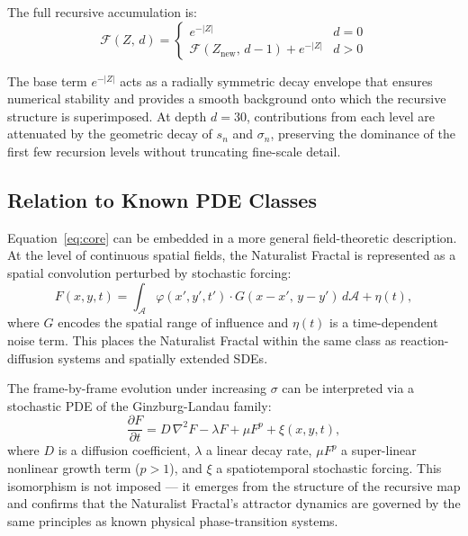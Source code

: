 \documentclass[twocolumn,amsmath,amssymb,prl]{revtex4-2}
\begin{document}
The full recursive accumulation is:
\begin{equation}
  \mathcal{F}(Z,\, d) = \begin{cases}
    e^{-|Z|} & d = 0 \\
    \mathcal{F}(Z_{\text{new}},\, d-1) + e^{-|Z|} & d > 0
  \end{cases}
\end{equation}

The base term $e^{-|Z|}$ acts as a radially symmetric decay envelope that
ensures numerical stability and provides a smooth background onto which the
recursive structure is superimposed.  At depth $d = 30$, contributions from
each level are attenuated by the geometric decay of $s_n$ and $\sigma_n$,
preserving the dominance of the first few recursion levels without truncating
fine-scale detail.

\subsection{Relation to Known PDE Classes}

Equation~\eqref{eq:core} can be embedded in a more general field-theoretic
description.  At the level of continuous spatial fields, the Naturalist
Fractal is represented as a spatial convolution perturbed by stochastic
forcing:
\begin{equation}
  F(x,y,t) = \int_{\mathcal{A}} \varphi(x',y',t') \cdot
              G(x-x',\, y-y') \, d\mathcal{A} + \eta(t),
\end{equation}
where $G$ encodes the spatial range of influence and $\eta(t)$ is a
time-dependent noise term.  This places the Naturalist Fractal within the
same class as reaction-diffusion systems and spatially extended SDEs.

The frame-by-frame evolution under increasing $\sigma$ can be interpreted via
a stochastic PDE of the Ginzburg-Landau family:
\begin{equation}
  \frac{\partial F}{\partial t} = D\,\nabla^2 F - \lambda F
    + \mu F^p + \xi(x,y,t),
\end{equation}
where $D$ is a diffusion coefficient, $\lambda$ a linear decay rate,
$\mu F^p$ a super-linear nonlinear growth term ($p > 1$), and $\xi$ a
spatiotemporal stochastic forcing.  This isomorphism is not imposed — it
emerges from the structure of the recursive map and confirms that the
Naturalist Fractal's attractor dynamics are governed by the same principles
as known physical phase-transition systems.
\end{document}
